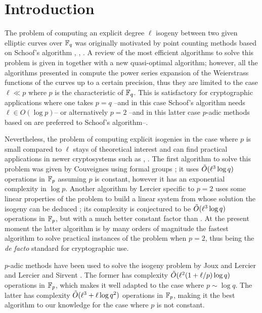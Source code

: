 \section{Introduction}

The problem of computing an explicit degree $\ell$ isogeny between two
given elliptic curves over $\mathbb{F}_q$ was originally motivated by point
counting methods based on Schoof's algorithm \cite{Atk91},
\cite{Elk91}, \cite{Sch95}. A review of the most efficient algorithms
to solve this problem is given in \cite{BoMoSaSc08} together with a
new quasi-optimal algorithm; however, all the algorithms presented in
\cite{BoMoSaSc08} compute the power series expansion of the
Weierstrass functions of the curves up to a certain precision, thus
they are limited to the case $\ell\ll p$ where $p$ is the
characteristic of $\mathbb{F}_q$. This is satisfactory for cryptographic
applications where one takes $p=q$ --and in this case Schoof's
algorithm needs $\ell\in O(\log p)$-- or alternatively $p=2$ --and in
this latter case $p$-adic methods based on \cite{Sat00} are preferred
to Schoof's algorithm--.

Nevertheless, the problem of computing explicit isogenies in the case
where $p$ is small compared to $\ell$ stays of theoretical interest
and can find practical applications in newer cryptosystems such as
\cite{Tes06}, \cite{RoSt06}. The first algorithm to solve this problem
was given by Couveignes using formal groups \cite{Cou94}; it uses
$\tilde{O}(\ell^3\log q)$ operations in $\mathbb{F}_p$ assuming $p$ is constant,
however it has an exponential complexity in $\log p$. Another
algorithm by Lercier specific to $p=2$ uses some linear properties of
the problem to build a linear system from whose solution the isogeny
can be deduced \cite{Ler96}; its complexity is conjectured to be
$\tilde{O}(\ell^3\log q)$ operations in $\mathbb{F}_p$, but with a much better
constant factor than \cite{Cou94}. At the present moment the latter
algorithm is by many orders of magnitude the fastest algorithm to
solve practical instances of the problem when $p=2$, thus being the
\emph{de facto} standard for cryptographic use.

$p$-adic methods have been used to solve the isogeny problem by Joux
and Lercier \cite{JL06} and Lercier and Sirvent \cite{LeSi09}. The
former has complexity $\tilde{O}(\ell^2(1 + \ell/p)\log q)$ operations in
$\mathbb{F}_p$, which makes it well adapted to the case where $p\sim\log
q$. The latter has complexity $\tilde{O}(\ell^3 + \ell\log q^2)$
operations in $\mathbb{F}_p$, making it the best algorithm to our knowledge
for the case where $p$ is not constant.

